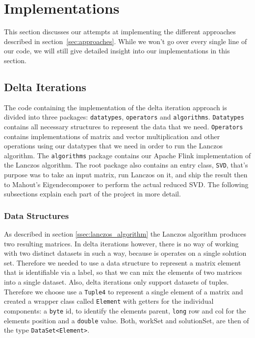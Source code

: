 \section{Implementations}


This section discusses our attempts at implementing the different approaches
described in section~\ref{sec:approaches}. While we won't go over every single
line of our code, we will still give detailed insight into our implementations
in this section.

\subsection{Delta Iterations}

The code containing the implementation of the delta iteration approach is divided into three packages: \texttt{datatypes}, \texttt{operators} and \texttt{algorithms}. \texttt{Datatypes} contains all necessary structures to represent the data that we need. \texttt{Operators} contains implementations of matrix and vector multiplication and other operations using our datatypes that we need in order to run the Lanczos algorithm. The \texttt{algorithms} package contains our Apache Flink implementation of the Lanczos algorithm. The root package also contains an entry class, \texttt{SVD}, that's purpose was to take an input matrix, run Lanczos on it, and ship the result then to Mahout's Eigendecomposer to perform the actual reduced SVD. The following subsections explain each part of the project in more detail.

\subsubsection{Data Structures}
As described in section \ref{ssec:lanczos_algorithm} the Lanczos algorithm produces two resulting matrices. In delta iterations however, there is no way of working with two distinct datasets in such a way, because is operates on a single solution set. Therefore we needed to use a data structure to represent a matrix element that is identifiable via a label, so that we can mix the elements of two matrices into a single dataset. Also, delta iterations only support datasets of tuples. Therefore we choose use a \texttt{Tuple4} to represent a single element of a matrix and created a wrapper class called \texttt{Element} with getters for the individual components: a \texttt{byte} id, to identify the elements parent, \texttt{long} row and col for the elements position and a \texttt{double} value. Both, workSet and solutionSet, are then of the type \texttt{DataSet<Element>}.


